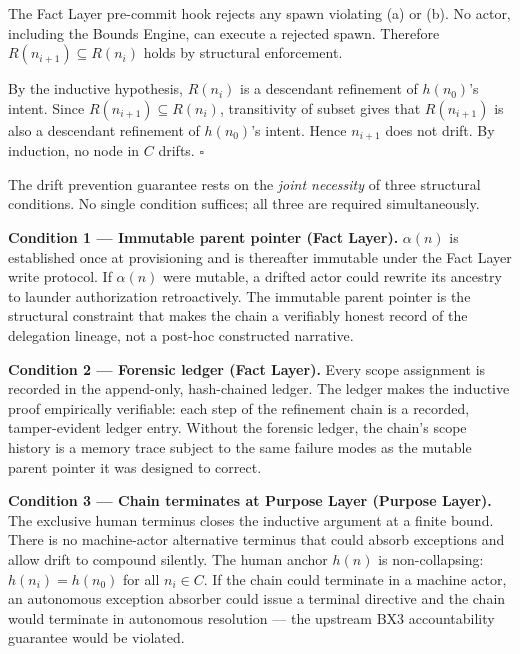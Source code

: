 The Fact Layer pre-commit hook rejects any spawn violating (a) or (b). No actor, including the Bounds Engine, can execute a rejected spawn. Therefore $R(n_{i+1}) \subseteq R(n_i)$ holds by structural enforcement.

By the inductive hypothesis, $R(n_i)$ is a descendant refinement of $h(n_0)$'s intent. Since $R(n_{i+1}) \subseteq R(n_i)$, transitivity of subset gives that $R(n_{i+1})$ is also a descendant refinement of $h(n_0)$'s intent. Hence $n_{i+1}$ does not drift. By induction, no node in $C$ drifts. $\square$

\medskip
The drift prevention guarantee rests on the \emph{joint necessity} of three structural conditions. No single condition suffices; all three are required simultaneously.

\medskip
\noindent\textbf{Condition 1 — Immutable parent pointer (Fact Layer).}
$\alpha(n)$ is established once at provisioning and is thereafter immutable under the Fact Layer write protocol. If $\alpha(n)$ were mutable, a drifted actor could rewrite its ancestry to launder authorization retroactively. The immutable parent pointer is the structural constraint that makes the chain a verifiably honest record of the delegation lineage, not a post-hoc constructed narrative.

\medskip
\noindent\textbf{Condition 2 — Forensic ledger (Fact Layer).}
Every scope assignment is recorded in the append-only, hash-chained ledger. The ledger makes the inductive proof empirically verifiable: each step of the refinement chain is a recorded, tamper-evident ledger entry. Without the forensic ledger, the chain's scope history is a memory trace subject to the same failure modes as the mutable parent pointer it was designed to correct.

\medskip
\noindent\textbf{Condition 3 — Chain terminates at Purpose Layer (Purpose Layer).}
The exclusive human terminus closes the inductive argument at a finite bound. There is no machine-actor alternative terminus that could absorb exceptions and allow drift to compound silently. The human anchor $h(n)$ is non-collapsing: $h(n_i) = h(n_0)$ for all $n_i \in C$. If the chain could terminate in a machine actor, an autonomous exception absorber could issue a terminal directive and the chain would terminate in autonomous resolution — the upstream BX3 accountability guarantee would be violated.

